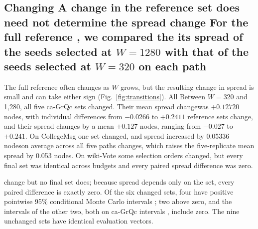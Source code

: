 \documentclass[smallextended]{svjour3}
\providecommand{\DIFaddtex}[1]{{\protect\color{blue} \sf #1}} %
\providecommand{\DIFdeltex}[1]{{\protect\color{red} \scriptsize #1}} %
\providecommand{\DIFaddbegin}{} %
\providecommand{\DIFaddend}{} %
\providecommand{\DIFdelbegin}{} %
\providecommand{\DIFdelend}{} %
\providecommand{\DIFadd}[1]{\texorpdfstring{\DIFaddtex{#1}}{#1}} %
\providecommand{\DIFdel}[1]{\texorpdfstring{\DIFdeltex{#1}}{}} %
\providecommand{\DIFscaledelfig}{0.5}
\newlength{\DIFdelgraphicswidth} %
\newlength{\DIFdelgraphicsheight} %
\providecommand{\DIFaddincludegraphics}[2][]{{\color{blue}\fbox{\DIFOincludegraphics[#1]{#2}}}} %
\providecommand{\DIFdelincludegraphics}[2][]{%
\sbox{\DIFdelgraphicsbox}{\DIFOincludegraphics[#1]{#2}}%
\settoboxwidth{\DIFdelgraphicswidth}{\DIFdelgraphicsbox} %
\settoboxtotalheight{\DIFdelgraphicsheight}{\DIFdelgraphicsbox} %
\scalebox{\DIFscaledelfig}{%
\parbox[b]{\DIFdelgraphicswidth}{\usebox{\DIFdelgraphicsbox}\\[-\baselineskip] \rule{\DIFdelgraphicswidth}{0em}}\llap{\resizebox{\DIFdelgraphicswidth}{\DIFdelgraphicsheight}{%
\setlength{\unitlength}{\DIFdelgraphicswidth}%
\begin{picture}(1,1)%
\thicklines\linethickness{2pt} %
{\color[rgb]{1,0,0}\put(0,0){\framebox(1,1){}}}%
{\color[rgb]{1,0,0}\put(0,0){\line( 1,1){1}}}%
{\color[rgb]{1,0,0}\put(0,1){\line(1,-1){1}}}%
\end{picture}%
}\hspace*{3pt}}} %
} %
\DeclareRobustCommand{\DIFaddbegin}{\DIFOaddbegin \let\includegraphics\DIFaddincludegraphics} %
\DeclareRobustCommand{\DIFaddend}{\DIFOaddend \let\includegraphics\DIFOincludegraphics} %
\DeclareRobustCommand{\DIFdelbegin}{\DIFOdelbegin \let\includegraphics\DIFdelincludegraphics} %
\DeclareRobustCommand{\DIFdelend}{\DIFOaddend \let\includegraphics\DIFOincludegraphics} %
\begin{document}
\subsection{\DIFdelbegin \DIFdel{Changing }\DIFdelend \DIFaddbegin \DIFadd{A change in }\DIFaddend the reference set \DIFdelbegin \DIFdel{does }\DIFdelend \DIFaddbegin \DIFadd{need }\DIFaddend not \DIFdelbegin \DIFdel{determine the spread }\DIFdelend change \DIFdelbegin %
\DIFdel{For the full reference , we compared the }\DIFdelend \DIFaddbegin \DIFadd{its }\DIFaddend spread\DIFdelbegin \DIFdel{of the seeds selected at $W=1280$ with that of the seeds selected at $W=320$ on each path }\DIFdelend \DIFaddbegin }
\DIFadd{The full reference often changes as $W$ grows, but the resulting change in spread is small and can take either sign }\DIFaddend (Fig.~\ref{fig:transitions}). \DIFdelbegin \DIFdel{All }\DIFdelend \DIFaddbegin \DIFadd{Between $W=320$ and 1,280, all }\DIFaddend five ca-GrQc \DIFdelbegin \DIFdel{sets changed. Their mean spread changewas $+0.12720$ nodes, with individual differences from $-0.0266$ to $+0.2411$}\DIFdelend \DIFaddbegin \DIFadd{reference sets change, and their spread changes by a mean $+0.127$ nodes, ranging from $-0.027$ to $+0.241$}\DIFaddend . On CollegeMsg one set \DIFdelbegin \DIFdel{changed, and spread increased by 0.05336 nodeson average across all five paths}\DIFdelend \DIFaddbegin \DIFadd{changes, which raises the five-replicate mean spread by 0.053 nodes}\DIFaddend . On wiki-Vote some selection orders \DIFdelbegin \DIFdel{changed, but every final set was identical across budgets and every paired spread difference was zero. }%

\DIFdelend \DIFaddbegin \DIFadd{change but no final set does; because spread depends only on the set, every paired difference is exactly zero. }\DIFaddend Of the six changed sets, four have \DIFdelbegin \DIFdel{positive pointwise }\DIFdelend 95\% \DIFdelbegin \DIFdel{conditional }\DIFdelend Monte Carlo intervals \DIFdelbegin \DIFdel{; two}\DIFdelend \DIFaddbegin \DIFadd{above zero, and the intervals of the other two, both on }\DIFaddend ca-GrQc\DIFdelbegin \DIFdel{intervals }\DIFdelend \DIFaddbegin \DIFadd{, }\DIFaddend include zero.
\DIFdelbegin \DIFdel{The nine unchanged sets have identical evaluation vectors.
}\DIFdelend 
\end{document}
